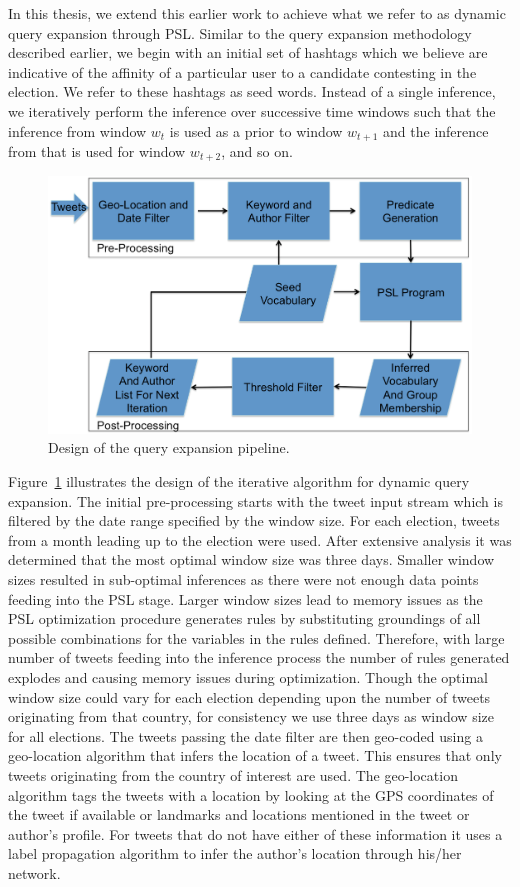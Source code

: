In this thesis, we extend this earlier work to achieve what we refer to as dynamic query expansion through PSL. 
Similar to the query expansion methodology described earlier, we begin with an initial set of 
hashtags which we believe are indicative of the affinity of a particular user to a candidate 
contesting in the election.
We refer to these hashtags as seed words.
Instead of a single inference, we iteratively perform the inference over successive time windows such that the inference from window $w_t$ is used as a prior to window $w_{t+1}$ and the inference from that is used for window $w_{t+2}$, and so on.
\begin{figure}[Ht]
	\centering
	\includegraphics[height=0.5\textheight, width=1.0\textwidth]{support_files/flowChart.png}
	\caption{Design of the query expansion pipeline.}
	\label{fig:flowchart}
\end{figure}
Figure~\ref{fig:flowchart} illustrates the design of the iterative algorithm for dynamic query expansion.
The initial pre-processing starts with the tweet input stream which is filtered by the date range specified by the window size. 
For each election, tweets from a month leading up to the election were used.
After extensive analysis it was determined that the most optimal window size was three days. 
Smaller window sizes resulted in sub-optimal inferences as there were not enough data points feeding into the PSL stage.
Larger window sizes lead to memory issues as the PSL optimization procedure generates rules by substituting groundings of all possible combinations for the variables in the rules defined.
Therefore, with large number of tweets feeding into the inference process the number of rules generated explodes and causing memory issues during optimization. 
Though the optimal window size could vary for each election depending upon the number of tweets originating from that country, for consistency we use three days as window size for all elections. 
The tweets passing the date filter are then geo-coded using a geo-location algorithm that infers the location of a tweet. 
This ensures that only tweets originating from the country of interest are used.
The geo-location algorithm tags the tweets with a location by looking at the GPS coordinates of the tweet if available or landmarks and locations mentioned in the tweet or author's profile. 
For tweets that do not have either of these information it uses a label propagation algorithm to infer the author's location through his/her network.

